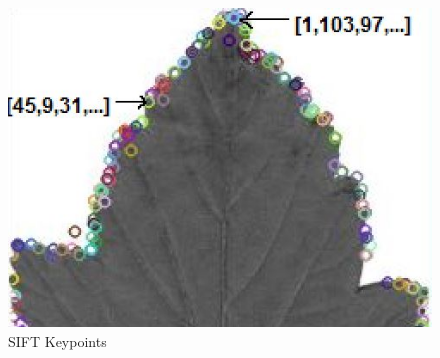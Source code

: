\documentclass[xcolor=table]{beamer}
\begin{document}
\begin{frame}
\begin{figure}[htbp]
\begin{minipage}[c]{.45\linewidth}
\begin{itemize}
    \end{itemize}
    \end{minipage}
    \hfill
    \begin{minipage}[c]{.45\linewidth}
      \begin{center}
	\includegraphics[scale=0.45]{siftKP2.jpg}
	\caption{SIFT Keypoints}
	\label{figure:Illustration}
      \end{center}
    \end{minipage}
  \end{figure}





\end{frame}
\end{document}
